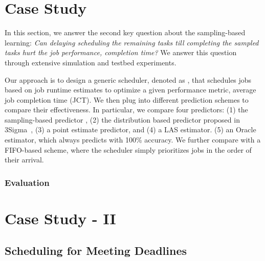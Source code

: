 \section{Case Study}
\label{sec:study}

In this section, we answer the second key question about the sampling-based
learning: {\em Can delaying scheduling the
remaining tasks till completing the sampled tasks hurt the
job performance, \eg completion time?
}
We answer this question through extensive simulation and testbed experiments.

Our approach is to design a generic scheduler, denoted as \gs, that schedules
jobs based on job runtime estimates to optimize a given performance metric, \eg
average job completion time (JCT).  We then plug into \gs different
prediction schemes to compare their effectiveness.
\rm{In particular, we compare four predictors:
(1) the sampling-based predictor \slearn,
(2) the distribution based predictor proposed in 3Sigma~\cite{3Sigma},
(3) a point estimate predictor,
and
(4) a LAS estimator.
(5) an Oracle estimator, which always predicts with 100\% accuracy.
We further compare with a FIFO-based scheme, where the scheduler
simply prioritizes jobs in the order of their arrival.
}






\subsubsection{Evaluation}
\label{sec:study:testbed}

\fi

\section{Case Study - II}
\label{sec:study2}

\subsection{Scheduling for Meeting Deadlines}
\label{sec:study2:design}
\fi
%
